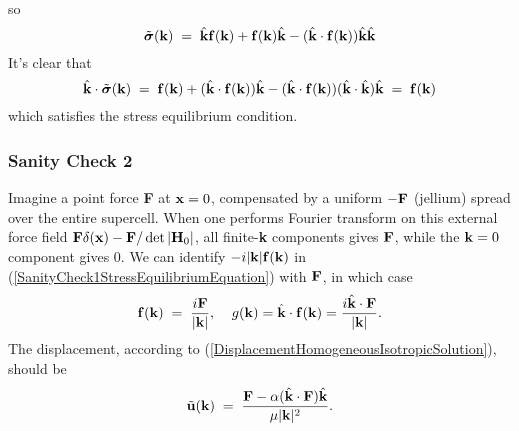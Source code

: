 \documentclass[12pt]{article}
\def\bmath#1{\mbox{\boldmath$#1$}}
\begin{document}
so
\begin{equation}
 \tilde{\bmath{\sigma}}({\bf k}) 
 \;=\; \hat{\bf k}{\bf f}({\bf k}) + {\bf f}({\bf k})\hat{\bf k}
- (\hat{\bf k}\cdot{\bf f}({\bf k}))\hat{\bf k}\hat{\bf k}
\end{equation}
It's clear that 
\begin{equation}
 \hat{\bf k}\cdot \tilde{\bmath{\sigma}}({\bf k}) 
 \;=\; {\bf f}({\bf k}) + (\hat{\bf k}\cdot{\bf f}({\bf k}))\hat{\bf k}
- (\hat{\bf k}\cdot{\bf f}({\bf k}))(\hat{\bf k}\cdot\hat{\bf k})\hat{\bf k}
 \;=\; {\bf f}({\bf k})
\end{equation}
which satisfies the stress equilibrium condition.


\subsubsection{Sanity Check 2}

Imagine a point force {\bf F} at ${\bf x}=0$, compensated by a uniform
$-{\bf F}$ (jellium) spread over the entire supercell.  When one
performs Fourier transform on this external force field ${\bf
F}\delta({\bf x})-{\bf F}/\det|{\bf H}_0|$, all finite-{\bf k}
components gives ${\bf F}$, while the ${\bf k}=0$ component gives $0$.
We can identify $-i|{\bf k}|{\bf f}({\bf k})$ in
(\ref{SanityCheck1StressEquilibriumEquation}) with ${\bf F}$, in which
case
\begin{equation}
 {\bf f}({\bf k}) \;=\; \frac{i{\bf F}}{|{\bf k}|}, \;\;\;\; g({\bf
 k}) = \hat{\bf k}\cdot {\bf f}({\bf k}) = \frac{i\hat{\bf k}\cdot{\bf
 F}}{|{\bf k}|}.
\end{equation}
The displacement, according to
(\ref{DisplacementHomogeneousIsotropicSolution}), should be
\begin{equation}
 \tilde{\bf u}({\bf k}) \;=\; 
 \frac{{\bf F} - \alpha (\hat{\bf k}\cdot{\bf F})\hat{\bf k}}{\mu |{\bf k}|^2}.
\end{equation}
\end{document}
